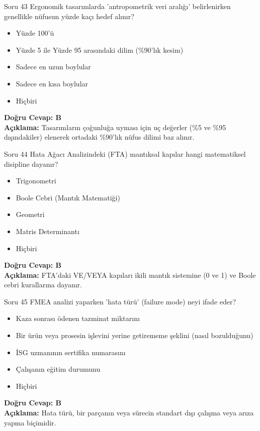 \documentclass[12pt,a4paper]{article}
\begin{document}
\begin{testcard}{Soru 43}
    Ergonomik tasarımlarda 'antropometrik veri aralığı' belirlenirken genellikle nüfusun yüzde kaçı hedef alınır?
    \begin{itemize}
        \item[A)] Yüzde 100'ü
        \item[B)] Yüzde 5 ile Yüzde 95 arasındaki dilim (\%90'lık kesim)
        \item[C)] Sadece en uzun boylular
        \item[D)] Sadece en kısa boylular
        \item[E)] Hiçbiri
    \end{itemize}
    \tcblower
    \textbf{Doğru Cevap: B} \\
    \textbf{Açıklama:} Tasarımların çoğunluğa uyması için uç değerler (\%5 ve \%95 dışındakiler) elenerek ortadaki \%90'lık nüfus dilimi baz alınır.
\end{testcard}

\begin{testcard}{Soru 44}
    Hata Ağacı Analizindeki (FTA) mantıksal kapılar hangi matematiksel disipline dayanır?
    \begin{itemize}
        \item[A)] Trigonometri
        \item[B)] Boole Cebri (Mantık Matematiği)
        \item[C)] Geometri
        \item[D)] Matris Determinantı
        \item[E)] Hiçbiri
    \end{itemize}
    \tcblower
    \textbf{Doğru Cevap: B} \\
    \textbf{Açıklama:} FTA'daki VE/VEYA kapıları ikili mantık sistemine (0 ve 1) ve Boole cebri kurallarına dayanır.
\end{testcard}

\begin{testcard}{Soru 45}
    FMEA analizi yaparken 'hata türü' (failure mode) neyi ifade eder?
    \begin{itemize}
        \item[A)] Kaza sonrası ödenen tazminat miktarını
        \item[B)] Bir ürün veya prosesin işlevini yerine getirememe şeklini (nasıl bozulduğunu)
        \item[C)] İSG uzmanının sertifika numarasını
        \item[D)] Çalışanın eğitim durumunu
        \item[E)] Hiçbiri
    \end{itemize}
    \tcblower
    \textbf{Doğru Cevap: B} \\
    \textbf{Açıklama:} Hata türü, bir parçanın veya sürecin standart dışı çalışma veya arıza yapma biçimidir.
\end{testcard}
\end{document}
